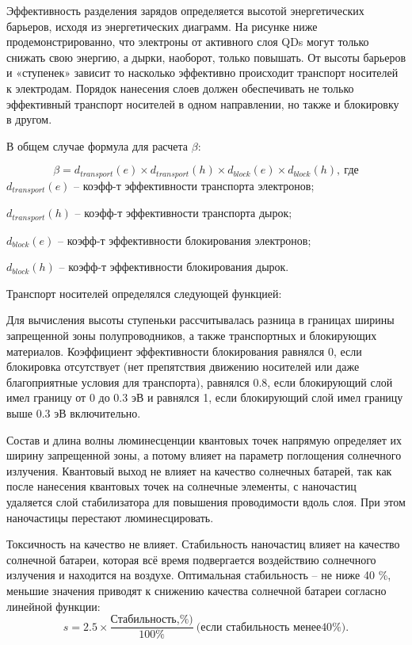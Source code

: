 Эффективность разделения зарядов определяется высотой энергетических барьеров, исходя из энергетических диаграмм. На рисунке ниже продемонстрированно, что электроны от активного слоя QDs могут только снижать свою энергию, а дырки, наоборот, только повышать. От высоты барьеров и «ступенек» зависит то насколько эффективно происходит транспорт носителей к электродам. Порядок нанесения слоев должен обеспечивать не только эффективный транспорт носителей в одном направлении, но также и блокировку в другом.

В общем случае формула для расчета $\beta$:

$$\beta=d_{transport} (e)\times d_{transport} (h)\times d_{block} (e)\times d_{block} (h), \: \text{где}$$
$d_{transport}(e)$ – коэфф-т эффективности транспорта электронов;

$d_{transport}(h)$ – коэфф-т эффективности транспорта дырок;

$d_{block}(e)$ – коэфф-т эффективности блокирования электронов;

$d_{block}(h)$ – коэфф-т эффективности блокирования дырок.


Транспорт носителей определялся следующей функцией:
 

Для вычисления высоты ступеньки рассчитывалась разница в границах ширины запрещенной зоны полупроводников, а также транспортных и блокирующих материалов. Коэффициент эффективности блокирования равнялся 0, если блокировка отсутствует (нет препятствия движению носителей или даже благоприятные условия для транспорта), равнялся 0.8, если блокирующий слой имел границу от 0 до 0.3 эВ и равнялся 1, если блокирующий слой имел границу выше 0.3 эВ включительно.

Состав и длина волны люминесценции квантовых точек напрямую определяет их ширину запрещенной зоны, а потому влияет на параметр поглощения солнечного излучения. Квантовый выход не влияет на качество солнечных батарей, так как после нанесения квантовых точек на солнечные элементы, с наночастиц удаляется слой стабилизатора для повышения проводимости вдоль слоя. При этом наночастицы перестают люминесцировать.

Токсичность на качество не влияет. Стабильность наночастиц влияет на качество солнечной батареи, которая всё время подвергается воздействию солнечного излучения и находится на воздухе. Оптимальная стабильность – не ниже 40 \%, меньшие значения приводят к снижению качества солнечной батареи согласно линейной функции:
$$s=2.5\times \frac{\text{Стабильность,} \%)}{100 \%} \: \text{(если стабильность менее} 40 \%).$$

